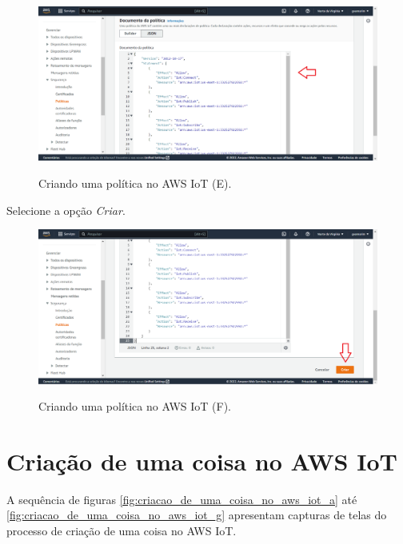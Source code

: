 \begin{figure}[H]
    \centering
    \caption{Criando uma política no AWS IoT (E).}
    \includegraphics[scale=0.472]{Imagens/criando_uma_politica_no_aws_iot_4.png}
    \label{fig:criando_uma_politica_no_aws_iot_e}
\end{figure}

Selecione a opção \textit{Criar}.

\begin{figure}[H]
    \centering
    \caption{Criando uma política no AWS IoT (F).}
    \includegraphics[scale=0.472]{Imagens/criando_uma_politica_no_aws_iot_5.png}
    \label{fig:criando_uma_politica_no_aws_iot_f}
\end{figure}


\section{Criação de uma coisa no AWS IoT}\label{section:criacao_de_uma_coisa_no_aws_iot}

A sequência de figuras \autoref{fig:criacao_de_uma_coisa_no_aws_iot_a} até \autoref{fig:criacao_de_uma_coisa_no_aws_iot_g} apresentam capturas de telas do processo de criação de uma coisa no AWS IoT.

